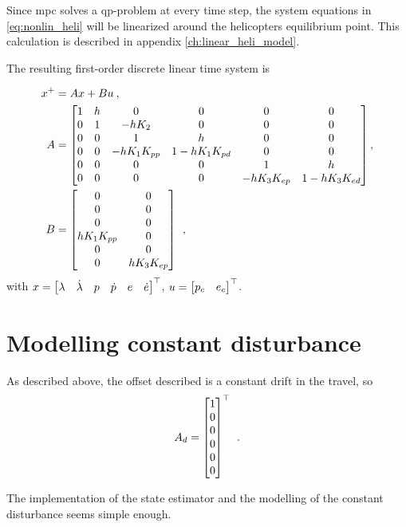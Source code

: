 Since \acrshort{mpc} solves a \acrshort{qp}-problem at every time step, the system equations in \eqref{eq:nonlin_heli} will be  linearized around the helicopters equilibrium point. This calculation is described in appendix \ref{ch:linear_heli_model}.

The resulting first-order discrete linear time system is 

\begin{equation}
    \begin{split}
        x^+ &= Ax + Bu \: , \: \: \\
        A &= \begin{bmatrix}1 & h & 0 & 0 & 0 & 0 \\
                0 & 1 & -hK_2 & 0 & 0 & 0 \\
                0 & 0 & 1 & h & 0 & 0 \\
                0 & 0 & -hK_1 K_{pp} & 1-hK_1 K_{pd} & 0 & 0 \\
                0 & 0 & 0 & 0 & 1 & h \\
                0 & 0 & 0 & 0 & -hK_3 K_{ep} & 1-hK_3 K_{ed}\end{bmatrix}, \\
        B &= \begin{bmatrix}0 & 0 \\ 0 & 0 \\ 0 & 0 \\
                h K_1 K_{pp} & 0 \\ 0 & 0 \\ 0 & h K_3 K_{ep}\end{bmatrix} \: \: ,
    \end{split}
\end{equation}
with $x = \begin{bmatrix}\lambda & \dot{\lambda} & p & \dot p & e & \dot e \end{bmatrix}^\top$, $u = \begin{bmatrix}p_c & e_c\end{bmatrix}^\top$.



\section{Modelling constant disturbance} \label{sec:estimator}

As described above, the offset described is a constant drift in the travel, so
\begin{equation}
    A_d = \begin{bmatrix}1 \\ 0 \\ 0 \\ 0 \\ 0 \\ 0 \end{bmatrix}^\top \: \: . 
\end{equation}

The implementation of the state estimator and the modelling of the constant disturbance seems simple enough. 


